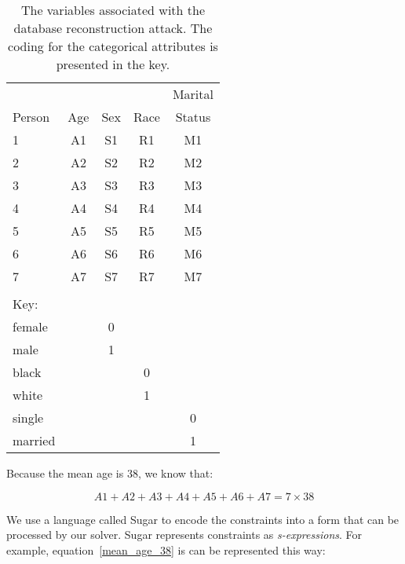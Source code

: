 \documentclass[runningheads]{llncs}
\begin{document}
\begin{table}
\caption{The variables associated with the database reconstruction
  attack. The coding for the categorical attributes is presented in the key.}\label{variables}
\begin{center}
\begin{tabular}{l|cccc}
       &     &     &      & Marital  \\
Person & Age & Sex & Race & Status   \\
\hline                             
1      & A1  & S1  & R1   & M1       \\
2      & A2  & S2  & R2   & M2       \\
3      & A3  & S3  & R3   & M3       \\
4      & A4  & S4  & R4   & M4       \\
5      & A5  & S5  & R5   & M5       \\
6      & A6  & S6  & R6   & M6       \\
7      & A7  & S7  & R7   & M7       \\
\hline
\multicolumn{1}{l}{}\\
\multicolumn{1}{l}{Key:}\\
\hline
female &     &  0  & \\
male   &     &  1  & \\
\hline
black  &     &     &  0   & \\
white  &     &     &  1   & \\
\hline
single &     &     &      &   0\\
married&     &     &      &   1\\
\hline
\end{tabular}
\end{center}
\end{table}

Because the mean age is 38, we know that:

\begin{equation}
A1 + A2 + A3 + A4 + A5 + A6 + A7 = 7 \times 38
\label{mean_age_38}
\end{equation}

We use a language called Sugar\cite{sugar} to encode the constraints
into a form that can be processed by our solver. Sugar represents
constraints as
\textit{s-expressions}\cite{McCarthy:1960:RFS:367177.367199}. For
example, equation~\ref{mean_age_38} is can be represented this way:
\end{document}
